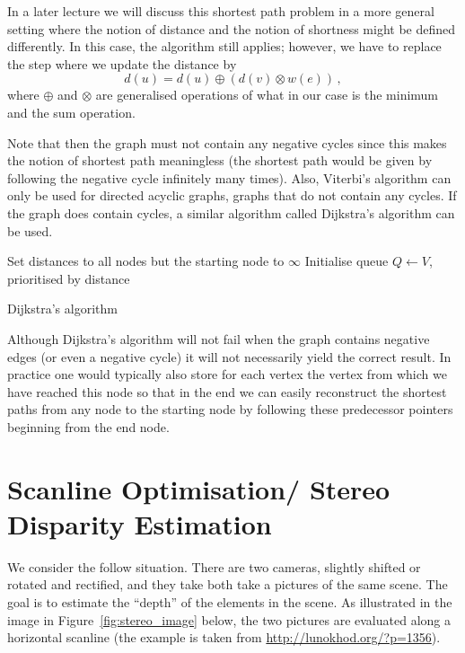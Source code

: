 In a later lecture we will discuss this shortest path problem in a more general
setting where the notion of distance and the notion of shortness might be
defined differently. In this case, the algorithm still applies; however, we have
to replace the step where we update the distance by
\begin{equation*}
  d(u) = d(u) \oplus \left( d(v) \otimes w(e) \right)\,,
\end{equation*}
where $\oplus$ and $\otimes$ are generalised operations of what in our case is
the minimum and the sum operation.

Note that then the graph must not contain any negative cycles since this makes
the notion of shortest path meaningless (the shortest path would be given by
following the negative cycle infinitely many times). Also, Viterbi's algorithm
can only be used for directed acyclic graphs, \ie graphs that do not contain any
cycles. If the graph does contain cycles, a similar algorithm called Dijkstra's
algorithm can be used.

\begin{algorithm}
  \SetAlgoLined%
  Set distances to all nodes but the starting node to $\infty$\;%
  Initialise queue $Q \gets V$, prioritised by distance\;%
  \caption{Dijkstra's algorithm}
\end{algorithm}

Although Dijkstra's algorithm will not fail when the graph contains negative
edges (or even a negative cycle) it will not necessarily yield the correct
result. In practice one would typically also store for each vertex the vertex
from which we have reached this node so that in the end we can easily
reconstruct the shortest paths from any node to the starting node by following
these predecessor pointers beginning from the end node.

\section{Scanline Optimisation/ Stereo Disparity Estimation}%
\label{sec:scanline}
We consider the follow situation. There are two cameras, slightly shifted or
rotated and rectified, and they take both take a pictures of the same scene. The
goal is to estimate the ``depth'' of the elements in the scene. As illustrated
in the image in Figure~\ref{fig:stereo_image} below, the two pictures are
evaluated along a horizontal scanline (the example is taken from
\url{http://lunokhod.org/?p=1356}).

